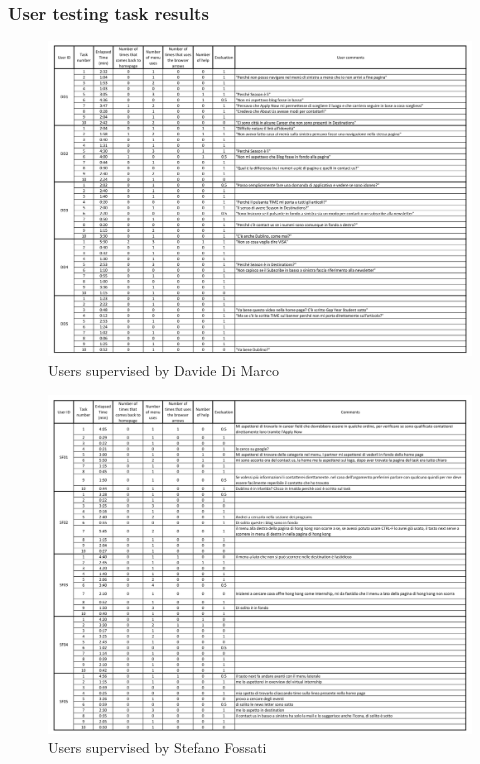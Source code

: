 \documentclass[11pt, letterpaper]{article}
\begin{document}
\subsubsection{User testing task results}
    \begin{figure}[H]
        \centering
        \includegraphics[width=18cm]{images/annex/DD_usertesting.png}
        \caption{Users supervised by Davide Di Marco}
    \end{figure}
    \begin{figure}[H]
        \centering
        \includegraphics[width=18cm]{images/annex/SF_usertesting.png}
        \caption{Users supervised by Stefano Fossati}
    \end{figure}
\end{document}
